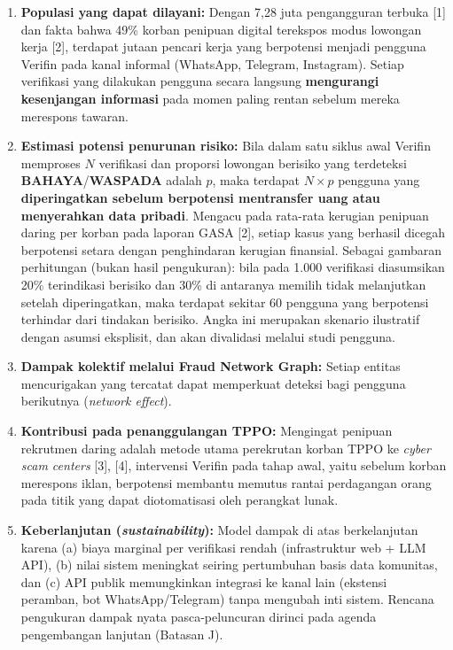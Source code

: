 \documentclass[12pt,a4paper]{article}
\begin{document}
\begin{enumerate}[label=\textbf{\arabic*.}]
\item \textbf{Populasi yang dapat dilayani:} Dengan 7,28 juta pengangguran terbuka [1] dan fakta
bahwa 49\% korban penipuan digital terekspos modus lowongan kerja [2], terdapat jutaan pencari
kerja yang berpotensi menjadi pengguna Verifin pada kanal informal (WhatsApp, Telegram, Instagram).
Setiap verifikasi yang dilakukan pengguna secara langsung \textbf{mengurangi kesenjangan informasi}
pada momen paling rentan sebelum mereka merespons tawaran.

\item \textbf{Estimasi potensi penurunan risiko:} Bila dalam satu siklus awal Verifin memproses
$N$ verifikasi dan proporsi lowongan berisiko yang terdeteksi \textbf{BAHAYA}/\textbf{WASPADA}
adalah $p$, maka terdapat $N \times p$ pengguna yang \textbf{diperingatkan sebelum berpotensi
mentransfer uang atau menyerahkan data pribadi}. Mengacu pada rata-rata kerugian penipuan daring
per korban pada laporan GASA [2], setiap kasus yang berhasil dicegah berpotensi setara dengan
penghindaran kerugian finansial. Sebagai gambaran perhitungan (bukan hasil pengukuran): bila pada
1.000 verifikasi diasumsikan 20\% terindikasi berisiko dan 30\% di antaranya memilih tidak
melanjutkan setelah diperingatkan, maka terdapat sekitar 60 pengguna yang berpotensi terhindar
dari tindakan berisiko. Angka ini merupakan skenario ilustratif dengan asumsi eksplisit, dan akan
divalidasi melalui studi pengguna.

\item \textbf{Dampak kolektif melalui Fraud Network Graph:} Setiap entitas mencurigakan yang
tercatat dapat memperkuat deteksi bagi pengguna berikutnya (\textit{network effect}).
\item \textbf{Kontribusi pada penanggulangan TPPO:} Mengingat penipuan rekrutmen daring adalah
metode utama perekrutan korban TPPO ke \textit{cyber scam centers} [3], [4], intervensi Verifin
pada tahap awal, yaitu sebelum korban merespons iklan, berpotensi membantu memutus rantai
perdagangan orang pada titik yang dapat diotomatisasi oleh perangkat lunak.

\item \textbf{Keberlanjutan (\textit{sustainability}):} Model dampak di atas berkelanjutan karena
(a) biaya marginal per verifikasi rendah (infrastruktur web + LLM API), (b) nilai sistem meningkat
seiring pertumbuhan basis data komunitas, dan (c) API publik memungkinkan integrasi ke kanal lain
(ekstensi peramban, bot WhatsApp/Telegram) tanpa mengubah inti sistem. Rencana pengukuran dampak
nyata pasca-peluncuran dirinci pada agenda pengembangan lanjutan (Batasan J).
\end{enumerate}
\end{document}
